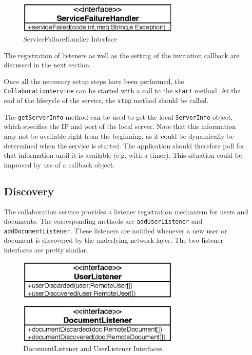 \begin{figure}[H]
 \centering
 \includegraphics[width=8.08cm,height=1.52cm]{../images/finalreport/architecture_servicefailurehandler_uml.eps}
 \caption{ServiceFailureHandler Interface}
 \label{fig:archoverview.servicefailurehandler}
\end{figure}


The registration of listeners as well as the setting of the invitation 
callback are discussed in the next section.

Once all the necessary setup steps have been performed, the
\texttt{Collaboration\-Service} can be started with a call to the
\texttt{start} method. At the end of the lifecycle of the
service, the \texttt{stop} method should be called.

The \texttt{get\-Server\-Info} method can be used to get the local 
\texttt{Server\-Info} object, which specifies the IP and port of the
local server. Note that this information may not be available right
from the beginning, as it could be dynamically be determined when the
service is started. The application should therefore poll for that information
until it is available (e.g. with a timer). This situation could be improved
by use of a callback object.


\subsection{Discovery}
\label{sect:archoverview.discovery}
The collaboration service provides a listener registration mechanism for
users and documents. The corresponding methods are \texttt{add\-User\-Listener}
and \texttt{add\-Document\-Listener}. These listeners are notified whenever a
new user or document is discovered by the underlying network layer. The two 
listener interfaces are pretty similar. 

\begin{figure}[H]
 \centering
 \includegraphics[width=8.04cm,height=4.34cm]{../images/finalreport/architecture_listener_uml.eps}
 \caption{DocumentListener and UserListener Interfaces}
\end{figure}

